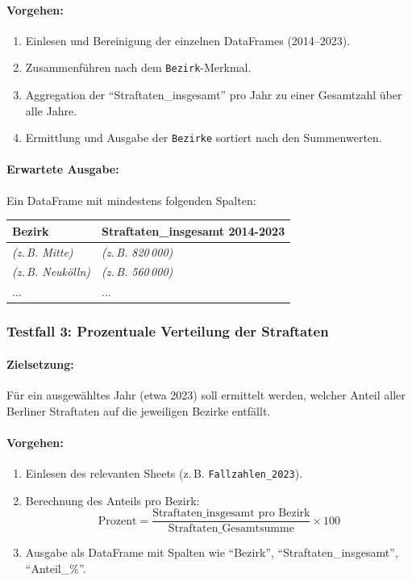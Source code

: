 \documentclass[11pt,a4paper]{article}
\begin{document}
\paragraph{Vorgehen:}
\begin{enumerate}
    \item Einlesen und Bereinigung der einzelnen DataFrames (2014--2023).
    \item Zusammenführen nach dem \texttt{Bezirk}-Merkmal.
    \item Aggregation der \enquote{Straftaten\_insgesamt} pro Jahr zu einer Gesamtzahl über alle Jahre.
    \item Ermittlung und Ausgabe der \texttt{Bezirke} sortiert nach den Summenwerten.
\end{enumerate}

\paragraph{Erwartete Ausgabe:}
Ein DataFrame mit mindestens folgenden Spalten:
\begin{center}
\begin{tabular}{l|l}
\textbf{Bezirk} & \textbf{Straftaten\_insgesamt 2014-2023} \\
\hline
\textit{(z.\,B. Mitte)} & \textit{(z.\,B. 820\,000)} \\
\textit{(z.\,B. Neukölln)} & \textit{(z.\,B. 560\,000)} \\
... & ...
\end{tabular}
\end{center}

\subsubsection{Testfall 3: Prozentuale Verteilung der Straftaten}
\paragraph{Zielsetzung:}
Für ein ausgewähltes Jahr (etwa 2023) soll ermittelt werden, welcher Anteil aller Berliner Straftaten auf die jeweiligen Bezirke entfällt.

\paragraph{Vorgehen:}
\begin{enumerate}
    \item Einlesen des relevanten Sheets (z.\,B. \texttt{Fallzahlen\_2023}).
    \item Berechnung des Anteils pro Bezirk: 
    \[
       \text{Prozent} = \frac{\text{Straftaten\_insgesamt pro Bezirk}}{\text{Straftaten\_Gesamtsumme}} \times 100 
    \]
    \item Ausgabe als DataFrame mit Spalten wie \enquote{Bezirk}, \enquote{Straftaten\_insgesamt}, \enquote{Anteil\_\%}.
\end{enumerate}
\end{document}
